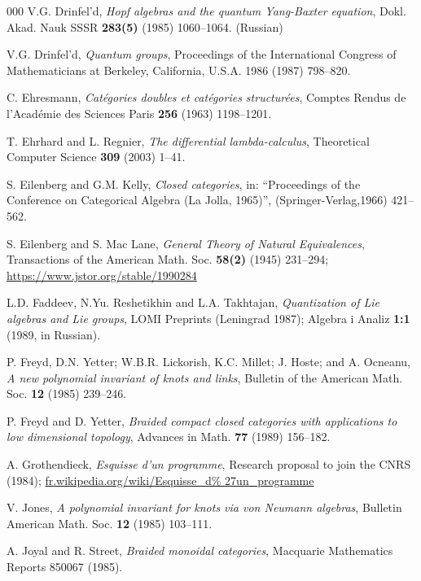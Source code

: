 \documentclass[a4paper,12pt]{article}
\theoremstyle{step}
\begin{document}
\begin{thebibliography}{000}
 V.G. Drinfel'd, 
\textit{Hopf algebras and the quantum Yang-Baxter equation},
Dokl. Akad. Nauk SSSR \textbf{283(5)} (1985) 1060--1064. (Russian)

 V.G. Drinfel'd, 
\textit{Quantum groups}, 
Proceedings of the International Congress of Mathematicians at
Berkeley, California, U.S.A. 1986 (1987) 798--820.

 C. Ehresmann, 
\textit{Cat\'egories doubles et cat\'egories structur\'ees}, 
Comptes Rendus de l'Acad\'emie des Sciences Paris \textbf{256} (1963) 1198--1201.

 T. Ehrhard and L. Regnier,
\textit{The differential lambda-calculus},
Theoretical Computer Science \textbf{309} (2003) 1--41.

 S. Eilenberg and G.M. Kelly, 
\textit{Closed categories}, 
in: ``Proceedings of the Conference on Categorical Algebra (La Jolla, 1965)'', (Springer-Verlag,1966) 421--562.

 S. Eilenberg and S. Mac Lane,
\textit{General Theory of Natural Equivalences},
Transactions of the American Math. Soc. \textbf{58(2)} (1945) 231--294; \url{https://www.jstor.org/stable/1990284} 
\label{EilMac}

 L.D. Faddeev, N.Yu. Reshetikhin and L.A. Takhtajan, 
\textit{Quantization of Lie algebras and Lie groups},
LOMI Preprints (Leningrad 1987); Algebra i Analiz \textbf{1:1} (1989, in Russian).

 P. Freyd, D.N. Yetter; W.B.R. Lickorish, K.C. Millet; J. Hoste; and A. Ocneanu, 
\textit{A new polynomial invariant of knots and links}, 
Bulletin of the American Math. Soc. \textbf{12} (1985) 239--246.

 P. Freyd and D. Yetter, 
\textit{Braided compact closed categories with applications to low dimensional topology}, 
Advances in Math. \textbf{77} (1989) 156--182.

 A. Grothendieck, 
\textit{Esquisse d'un programme}, 
Research proposal to join the CNRS (1984);
\newline \url{fr.wikipedia.org/wiki/Esquisse_d\% 27un_programme}

 V. Jones, 
\textit{A polynomial invariant for knots via von Neumann algebras}, 
Bulletin American Math. Soc. \textbf{12} (1985) 103--111.

 A. Joyal and R. Street, 
\textit{Braided monoidal categories}, 
Macquarie Mathematics Reports 850067 (1985).


\end{thebibliography}
\end{document}
